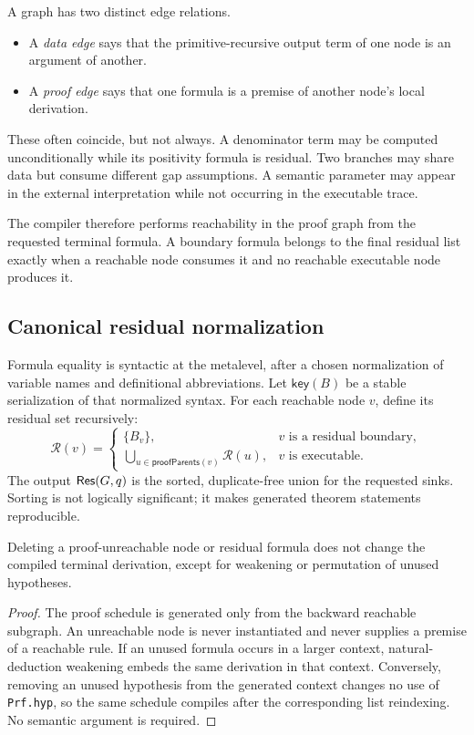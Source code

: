 A graph has two distinct edge relations.
\begin{itemize}
  \item A \emph{data edge} says that the primitive-recursive output term of one node is an argument of another.
  \item A \emph{proof edge} says that one formula is a premise of another node's local derivation.
\end{itemize}
These often coincide, but not always.  A denominator term may be computed unconditionally while its positivity formula is residual.  Two branches may share data but consume different gap assumptions.  A semantic parameter may appear in the external interpretation while not occurring in the executable trace.

The compiler therefore performs reachability in the proof graph from the requested terminal formula.  A boundary formula belongs to the final residual list exactly when a reachable node consumes it and no reachable executable node produces it.

\subsection{Canonical residual normalization}

Formula equality is syntactic at the metalevel, after a chosen normalization of variable names and definitional abbreviations.  Let \(\mathsf{key}(B)\) be a stable serialization of that normalized syntax.  For each reachable node \(v\), define its residual set recursively:
\[
 \mathcal R(v)=
 \begin{cases}
   \{B_v\}, & v\text{ is a residual boundary},\\
   \bigcup_{u\in\mathsf{proofParents}(v)}\mathcal R(u), & v\text{ is executable}.
 \end{cases}
\]
The output \(\mathsf{Res}(G,q)\) is the sorted, duplicate-free union for the requested sinks.  Sorting is not logically significant; it makes generated theorem statements reproducible.

\begin{lemma}\label{lem:residual-irrelevance}
Deleting a proof-unreachable node or residual formula does not change the compiled terminal derivation, except for weakening or permutation of unused hypotheses.
\end{lemma}

\begin{proof}
The proof schedule is generated only from the backward reachable subgraph.  An unreachable node is never instantiated and never supplies a premise of a reachable rule.  If an unused formula occurs in a larger context, natural-deduction weakening embeds the same derivation in that context.  Conversely, removing an unused hypothesis from the generated context changes no use of \texttt{Prf.hyp}, so the same schedule compiles after the corresponding list reindexing.  No semantic argument is required.
\end{proof}

